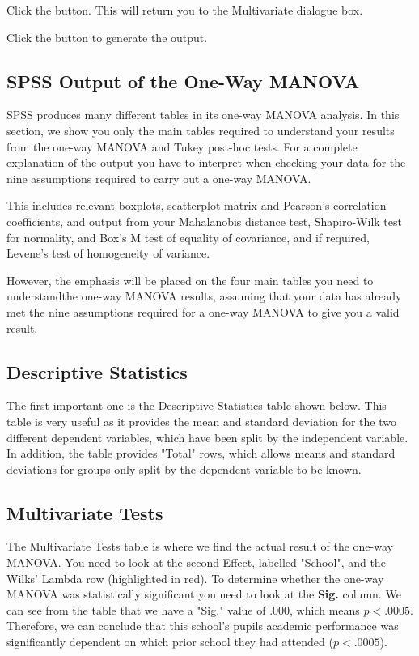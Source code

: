 \documentclass[12pt]{article} %
\begin{document}
Click the  button. This will return you to the Multivariate dialogue box.

Click the  button to generate the output.
\newpage
\subsection{SPSS Output of the One-Way MANOVA}
SPSS produces many different tables in its one-way MANOVA analysis. In this section, we show you only the main tables required to understand your results from the one-way MANOVA and Tukey post-hoc tests. For a complete explanation of the output you have to interpret when checking your data for the nine assumptions required to carry out a one-way MANOVA. 

This includes relevant boxplots, scatterplot matrix and Pearson's correlation coefficients, and output from your Mahalanobis distance test, Shapiro-Wilk test for normality, and Box's M test of equality of covariance, and if required, Levene's test of homogeneity of variance.

However, the emphasis will be placed on the four main tables you need to understandthe one-way MANOVA results, assuming that your data has already met the nine assumptions required for a one-way MANOVA to give you a valid result.



\subsection{Descriptive Statistics}
The first important one is the Descriptive Statistics table shown below. This table is very useful as it provides the mean and standard deviation for the two different dependent variables, which have been split by the independent variable. In addition, the table provides "Total" rows, which allows means and standard deviations for groups only split by the dependent variable to be known.




\subsection{Multivariate Tests}
The Multivariate Tests table is where we find the actual result of the one-way MANOVA. You need to look at the second Effect, labelled "School", and the Wilks' Lambda row (highlighted in red). To determine whether the one-way MANOVA was statistically significant you need to look at the \textbf{Sig.} column. We can see from the table that we have a "Sig." value of .000, which means $p < .0005$. Therefore, we can conclude that this school's pupils academic performance was significantly dependent on which prior school they had attended ($p < .0005$).
\end{document}
